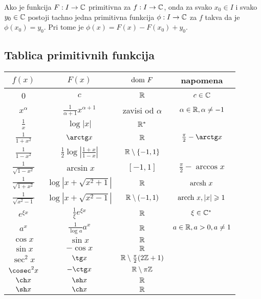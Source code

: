 \documentclass[../main.tex]{subfiles}
\begin{document}
\begin{posl}
Ako je funkcija $F:I \to \mathbb{C}$ primitivna za $f: I \to \mathbb{C}$, onda za svako $x_0 \in I$ i svako $y_0 \in \mathbb{C}$ postoji tachno jedna primitivna funkcija $\phi : I \to \mathbb{C}$ za $f$ takva da je $\phi (x_0) = y_0$. Pri tome je $\phi(x)=F(x)-F(x_0)+y_0$.
\end{posl}
\newpage
\subsection{Tablica primitivnih funkcija}
\begin{center}
\vspace{0.5cm}
\begin{tabular}{||c  c  c  c||} 
 \hline
 $f(x)$ & $F(x)$ & $\text{\latin {dom }}F$ & napomena \\ [0.5ex] 
 \hline\hline
 0 & $c$ & $\mathbb{R}$ & $c\in \mathbb{C}$ \\ [2ex] 
 $x^{\alpha}$ & $\frac{1}{\alpha +1} x^{\alpha +1}$ & zavisi od $\alpha$ & $\alpha \in \mathbb{R} , \alpha \ne -1$ \\[2ex] 
 $\frac{1}{x}$ & $\log|x|$ & $\mathbb{R}^{*}$ &  \\[2ex] 
 $\frac{1}{1+x^2}$ & $\arctg x$ & $\mathbb{R}$ & $\frac{\pi}{2} -\arctg x$ \\[2ex] 
  $\frac{1}{1-x^2}$ & $\frac{1}{2} \log |\frac{1+x}{1-x}|$ & $\mathbb{R} \setminus \{-1,1\} $ &  \\ [2ex] 
 $\frac{1}{\sqrt{1-x^2}}$ & $\arcsin x$ & $[-1,1]$ & $\frac{\pi}{2}-\arccos x$ \\ [2ex] 
 $\frac{1}{\sqrt{1+x^2}}$ & $\log |x+\sqrt{x^2+1}|$ & $ \mathbb{R} $ & $\text{\latin {arcsh }} x$\\[2ex] 
 $\frac{1}{\sqrt{x^2-1}}$ & $\log |x+\sqrt{x^2-1}|$ & $\mathbb{R}\setminus(-1,1)$ & $\text{\latin {arcch }} x, |x|\geqslant 1$ \\[2ex] 
 $e^{\xi x}$ & $\frac{1}{\xi} e^{\xi x}$ & $\mathbb{R}$ & $\xi \in \mathbb{C}^{*}$ \\[2ex] 
  $a^x$ & $\frac{1}{\log a} a^x $ & $\mathbb{R} $ & $a\in \mathbb{R}, a>0, a\ne 1$ \\ [2ex] 
  $\cos x$ & $\sin x$ & $\mathbb{R}$ &  \\ [2ex] 
 $\sin x$ & $ -\cos x$ & $\mathbb{R}$ &\\[2ex] 
 $\sec^2 x$ & $\tg x$ & $\mathbb{R} \setminus \frac{\pi}{2}(2\mathbb{Z}+1)$ &  \\[2ex]
 $\cosec^2 x$ & $-\ctg x$ & $\mathbb{R} \setminus \pi \mathbb{Z}$ &  \\[2ex] 
  $\ch x$ & $\sh x$ & $\mathbb{R} $ &  \\ [2ex] 
  $\sh x$ & $\ch x$ & $\mathbb{R} $ &  \\ [2ex] 
 \hline
\end{tabular}
\end{center}
\end{document}

